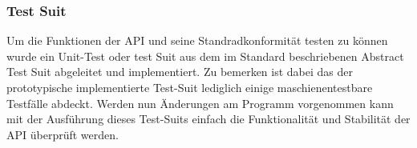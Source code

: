 \subsubsection{Test Suit}
Um die Funktionen der API und seine Standradkonformität testen zu können wurde ein Unit-Test oder test Suit aus dem im Standard beschriebenen Abstract Test Suit abgeleitet und 
implementiert. Zu bemerken ist dabei das der prototypische implementierte Test-Suit lediglich einige maschienentestbare Testfälle abdeckt. 
Werden nun Änderungen am Programm vorgenommen kann mit der Ausführung dieses Test-Suits einfach die Funktionalität und Stabilität der API überprüft werden. 